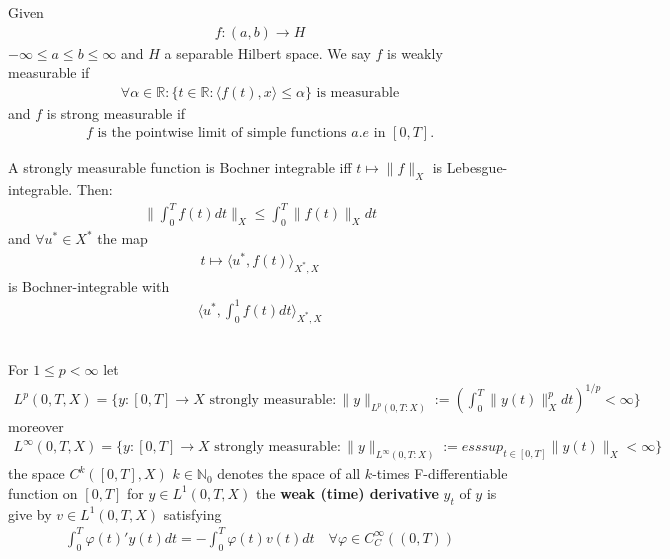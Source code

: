 \begin{definition}
	Given 
	\begin{align*}
		f: (a, b) \rightarrow H
	\end{align*}
	$-\infty \le a \le b \le \infty$ and $H$ a separable Hilbert space. We say $f$ is weakly measurable if 
	\begin{align*}
		\forall \alpha \in \mathbb{R}: \{t \in \mathbb{R}: \langle f(t), x \rangle \le \alpha \}  \text{ is measurable}
	\end{align*}
	and $f$ is strong measurable if 
	\begin{align*}
		\text{$f$ is the pointwise limit of simple functions } a.e \text{ in } [0, T].
	\end{align*}
\end{definition}

\begin{theorem}
	A strongly measurable function is Bochner integrable iff $t \mapsto \|f\|_X$ is Lebesgue-integrable. Then:
	\begin{align*}
		\| \int_0^T f(t) dt \|_X \le \int_0^T \|f(t)\|_X dt
	\end{align*}
	and $\forall u^* \in X^*$ the map
	\begin{align*}
		t \mapsto \langle u^*, f(t) \rangle_{X^*, X} 
	\end{align*}
	is Bochner-integrable with 
	\begin{align*}
		\langle u^*, \int_0^1 f(t)dt \rangle_{X^*, X}
	\end{align*}
\end{theorem}

\quad\\
For $1 \le p < \infty$ let
\begin{align*}
	L^p(0, T, X) = \bigg\{ y: [0, T] \rightarrow X \text{ strongly measurable}: \|y\|_{L^p(0, T: X)}:= (\int_0^T\|y(t)\|_X^p dt)^{1 \slash p} < \infty \bigg\}
\end{align*}
moreover
\begin{align*}
	L^\infty(0, T, X) = \bigg\{ y: [0, T] \rightarrow X \text{ strongly measurable}: \|y\|_{L^\infty(0, T: X)}:= esssup_{t \in [0, T]} \|y(t)\|_X < \infty \bigg\}
\end{align*}
the space $C^k([0, T], X)$ $k \in \mathbb{N}_0$ denotes the space of all $k$-times F-differentiable function on $[0, T]$ for $y \in L^1(0, T, X)$ the \textbf{weak (time) derivative} $y_t$ of $y$ is give by $v \in L^1(0, T, X)$ satisfying
\begin{align*}
	\int_0^T \varphi(t)'y(t) dt = -\int_0^T \varphi(t) v(t) dt
	\quad \forall \varphi \in C_C^\infty((0, T))
\end{align*}

